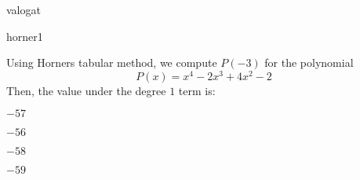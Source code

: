 \documentclass[12pt]{article}
\begin{document}
\begin{quiz}{valogat}
\begin{multi}{horner1}

Using Horners tabular method, we compute $P(-3)$ for the polynomial
$$P(x)=x^4-2x^3+4x^2-2$$
Then, the value under the degree $1$ term is:
\item* $ -57 $
\item  $ -56 $
\item  $ -58 $
\item  $ -59 $
\end{multi}
\end{quiz}
\end{document}
